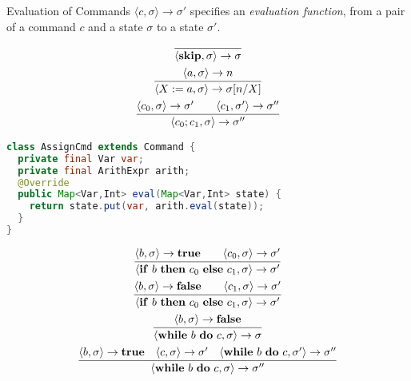 \begin{frame}[fragile]{Evaluation of Commands}
    $\langle c, \sigma \rangle \rightarrow \sigma'$ specifies an \emph{evaluation function}, from
    a pair of a command $c$ and a state $\sigma$ to a state $\sigma'$.\\
    \begin{overprint}
        \begin{gather*}
            \infer{\langle \mathbf{skip}, \sigma \rangle \rightarrow \sigma}{} \\
            \infer{\langle X := a , \sigma \rangle \rightarrow \sigma[n/X]}{\langle a , \sigma \rangle \rightarrow n} \\
            \infer{\langle c_0; c_1 , \sigma \rangle \rightarrow \sigma''}{\langle c_0 , \sigma \rangle \rightarrow  \sigma' \qquad \langle c_1 , \sigma' \rangle \rightarrow \sigma''}
        \end{gather*}
        \begin{lstlisting}[language=java, basicstyle=\small]
class AssignCmd extends Command {
  private final Var var;
  private final ArithExpr arith;
  @Override
  public Map<Var,Int> eval(Map<Var,Int> state) {
    return state.put(var, arith.eval(state));
  }
}
        \end{lstlisting}
        \begin{gather*}
            \infer{\langle \mathbf{if}\ b\ \mathbf{then}\ c_0\ \mathbf{else}\ c_1, \sigma \rangle \rightarrow \sigma'}{\langle b , \sigma \rangle \rightarrow  \mathbf{true} \qquad \langle c_0 , \sigma \rangle \rightarrow \sigma'} \\
            \infer{\langle \mathbf{if}\ b\ \mathbf{then}\ c_0\ \mathbf{else}\ c_1, \sigma \rangle \rightarrow \sigma'}{\langle b , \sigma \rangle \rightarrow  \mathbf{false} \qquad \langle c_1 , \sigma \rangle \rightarrow \sigma'} \\
            \infer{\langle \mathbf{while}\ b\ \mathbf{do}\ c, \sigma \rangle \rightarrow \sigma}{\langle b , \sigma \rangle \rightarrow  \mathbf{false} } \\
            \infer{\langle \mathbf{while}\ b\ \mathbf{do}\ c, \sigma \rangle \rightarrow \sigma''}{\langle b , \sigma \rangle \rightarrow  \mathbf{true} \quad \langle c , \sigma \rangle \rightarrow \sigma' \quad \langle \mathbf{while}\ b\ \mathbf{do}\ c, \sigma' \rangle \rightarrow \sigma''}
        \end{gather*}
    \end{overprint}
\end{frame}


